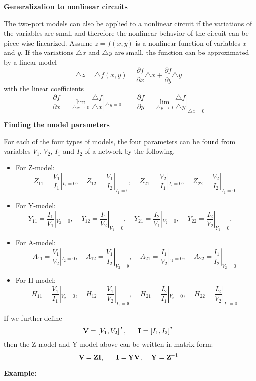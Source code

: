 {\bf Generalization to nonlinear circuits}

The two-port models can also be applied to a nonlinear circuit if the 
variations of the variables are small and therefore the nonlinear behavior 
of the circuit can be piece-wise linearized. Assume $z=f(x,y)$ is a nonlinear
function of variables $x$ and $y$. If the variations $\triangle x$ and 
$\triangle y$ are small, the function can be approximated by a linear 
model 
\[ \triangle z=\triangle f(x,y)=\frac{\partial f}{\partial x}\triangle x +
                    \frac{\partial f}{\partial y}\triangle y  \]
with the linear coefficients
\[ \frac{\partial f}{\partial x}=\lim_{\triangle x\rightarrow 0}
   \frac{\triangle f}{\triangle x}|_{\triangle y=0}
   \;\;\;\;\;\;\;\;
   \frac{\partial f}{\partial y}=\lim_{\triangle y\rightarrow 0}
   \frac{\triangle f}{\triangle y}|_{\triangle x=0}
\]

{\bf Finding the model parameters}

For each of the four types of models, the four parameters can be found
from variables $V_1$, $V_2$, $I_1$ and $I_2$ of a network by the following.
\begin{itemize}
\item For Z-model:
\[	Z_{11}=\frac{V_1}{I_1}|_{I_2=0},\;\;\;\;
	Z_{12}=\frac{V_1}{I_2}|_{I_1=0},\;\;\;\;
	Z_{21}=\frac{V_2}{I_1}|_{I_2=0},\;\;\;\;
	Z_{22}=\frac{V_2}{I_2}|_{I_1=0}
\]
\item For Y-model:
\[	Y_{11}=\frac{I_1}{V_1}|_{V_2=0},\;\;\;\;
	Y_{12}=\frac{I_1}{V_2}|_{V_1=0},\;\;\;\;
	Y_{21}=\frac{I_2}{V_1}|_{V_2=0},\;\;\;\;
	Y_{22}=\frac{I_2}{V_2}|_{Y_1=0},\;\;\;\;
\]
\item For A-model:
\[	A_{11}=\frac{V_1}{V_2}|_{I_2=0},\;\;\;\;
	A_{12}=\frac{V_1}{I_2}|_{V_2=0},\;\;\;\;
	A_{21}=\frac{I_1}{V_2}|_{I_2=0},\;\;\;\;
	A_{22}=\frac{I_1}{I_2}|_{V_2=0}
\]
\item For H-model:
\[	H_{11}=\frac{V_1}{I_1}|_{V_2=0},\;\;\;\;
	H_{12}=\frac{V_1}{V_2}|_{I_1=0},\;\;\;\;
	H_{21}=\frac{I_2}{I_1}|_{V_2=0},\;\;\;\;
	H_{22}=\frac{I_2}{V_2}|_{I_1=0}
\]
\end{itemize}

If we further define
\[	{\bf V}=[V_1, V_2]^T,\;\;\;\;\;\;{\bf I}=[I_1, I_2]^T	\]
then the Z-model and Y-model above can be written in matrix form:
\[ {\bf V}={\bf Z} {\bf I},\;\;\;\;\;\;{\bf I}={\bf Y} {\bf V},\;\;\;\;
	{\bf Y}={\bf Z}^{-1}		\]

{\bf Example: } 


